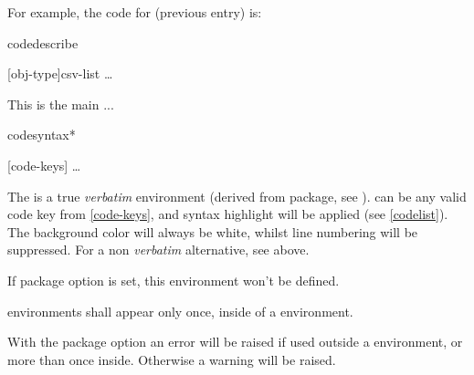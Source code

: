\documentclass{article}
\begin{document}
For example, the code for   (previous entry) is:

\begin{codestore}[demoD]
\begin{codedescribe}[ env , new=2023/05/01, update=2023/05/01, note={a note example}, update=2024/02/16, update=2025/09/25]{codedescribe}
  \begin{codesyntax}
    \tsmacro{\begin{codedescribe}}[obj-type]{csv-list}
    \ldots
    \tsmacro{\end{codedescribe}}{}
  \end{codesyntax}
  This is the main ...
\end{codedescribe}
\end{codestore}  





\begin{codedescribe}[env,new=2025/12/18]{codesyntax*}
\begin{codesyntax}
\tsmacro{\begin{codesyntax*}}[code-keys]{}
\ldots
\tsmacro{\end{codesyntax*}}{}
\end{codesyntax}
The  is a true \emph{verbatim} environment (derived from  package, see \cite{listings}).  can be any valid code key from \ref{code-keys}, and syntax highlight will be applied (see \ref{codelist}). The background color will always be white, whilst line numbering will be suppressed. For a non \emph{verbatim} alternative, see  above.
\end{codedescribe}

\begin{tsremark}
If  package option is set, this environment won't be defined.
\end{tsremark}
\begin{tsremark}
 environments shall appear only once, inside of a  environment. 
\end{tsremark}
\begin{tsremark}
With the  package option
an error will be raised if used outside a  environment, or more than once inside. Otherwise a warning will be raised.
\end{tsremark}
\end{document}
